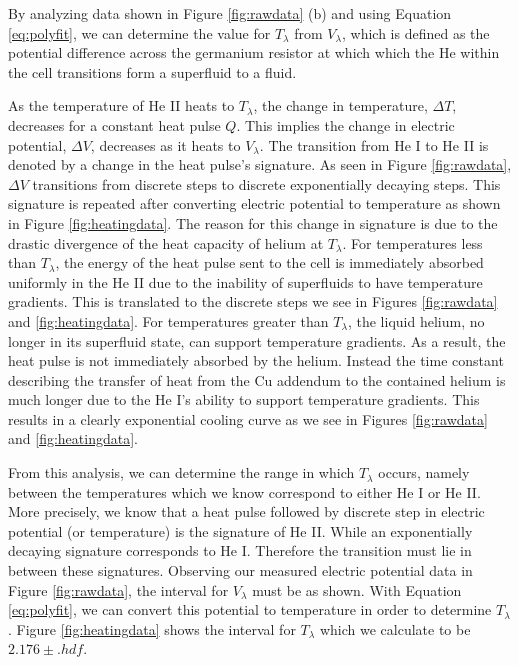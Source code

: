 By analyzing data shown in Figure \ref{fig:rawdata} (b) and using Equation \ref{eq:polyfit}, we can determine the value for $T_{\lambda}$ from $V_{\lambda}$, which is defined as the potential difference across the germanium resistor at which which the He within the cell transitions form a superfluid to a fluid. 

As the temperature of He II heats to $T_{\lambda}$, the change in temperature, $\Delta T$, decreases for a constant heat pulse $Q$.  This implies the change in electric potential, $\Delta V$, decreases as it heats to $V_{\lambda}$.  The transition from He I to He II is denoted by a change in the heat pulse's signature.  As seen in Figure \ref{fig:rawdata}, $\Delta V$ transitions from discrete steps to discrete exponentially decaying steps.  This signature is repeated after converting electric potential to temperature as shown in Figure \ref{fig:heatingdata}.  The reason for this change in signature is due to the drastic divergence of the heat capacity of helium at $T_{\lambda}$.  For temperatures less than $T_{\lambda}$, the energy of the heat pulse sent to the cell is immediately absorbed uniformly in the He II due to the inability of superfluids to have temperature gradients.  This is translated to the discrete steps we see in Figures \ref{fig:rawdata} and \ref{fig:heatingdata}.  For temperatures greater than $T_{\lambda}$, the liquid helium, no longer in its superfluid state, can support temperature gradients.  As a result, the heat pulse is not immediately absorbed by the helium.  Instead the time constant describing the transfer of heat from the Cu addendum to the contained helium is much longer due to the He I's ability to support temperature gradients. This results in a clearly exponential cooling curve as we see in Figures \ref{fig:rawdata} and \ref{fig:heatingdata}.  

From this analysis, we can determine the range in which $T_{\lambda}$ occurs, namely between the temperatures which we know correspond to either He I or He II.  More precisely, we know that a heat pulse followed by discrete step in electric potential (or temperature) is the signature of He II.  While an exponentially decaying signature corresponds to He I. Therefore the transition must lie in between these signatures.  Observing our measured electric potential data in Figure \ref{fig:rawdata}, the interval for $V_{\lambda}$ must be as shown.  With Equation \ref{eq:polyfit}, we can convert this potential to temperature in order to determine $T_{\lambda}$.  Figure \ref{fig:heatingdata} shows the interval for $T_{\lambda}$ which we calculate to be $2.176\pm.hdf$. 

